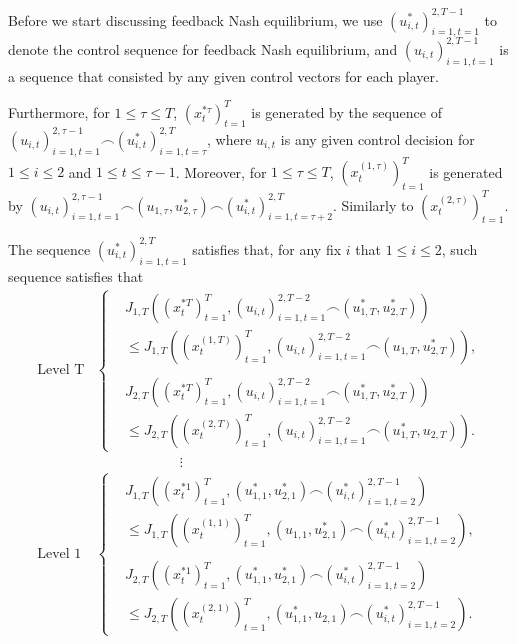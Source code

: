 \documentclass{article}
\begin{document}
Before we start discussing feedback Nash equilibrium, we use $(u_{i,t}^{*})_{i=1,t=1}^{2,T-1}$ to denote the control sequence for feedback Nash equilibrium, and $(u_{i,t})_{i=1,t=1}^{2,T-1}$ is a sequence that consisted by any given control vectors for each player. 

Furthermore, for $1 \leq \tau \leq T$, $(x_{t}^{*\tau})_{t=1}^{T}$ is generated by the sequence of $(u_{i,t})_{i=1,t=1}^{2,\tau-1} \frown (u_{i,t}^{*})_{i=1,t=\tau}^{2,T}$, where $u_{i,t}$ is any given control decision for $1 \leq i \leq 2$ and $1 \leq t \leq \tau-1$. Moreover, for $1 \leq \tau \leq T$, $(x_{t}^{(1,\tau)})_{t=1}^{T}$ is generated by $(u_{i,t})_{i=1,t=1}^{2,\tau-1} \frown (u_{1,\tau},u_{2,\tau}^{*}) \frown (u_{i,t}^{*})_{i=1,t=\tau+2}^{2,T}$. Similarly to $(x_{t}^{(2,\tau)})_{t=1}^{T}$.

The sequence $( u_{i,t}^{*})_{i=1,t=1}^{2,T}$ satisfies that, for any fix $i$ that $1 \leq i \leq 2$, such 
sequence satisfies that 
\begin{equation}\label{eq:nashIneq}
    \begin{split}
        \text{Level T}
        &\begin{cases}
            &J_{1,T}((x_{t}^{*T})_{t=1}^{T}, (u_{i,t})_{i=1,t=1}^{2,T-2} \frown (u_{1,T}^{*},u_{2,T}^{*})) \\ & \leq J_{1,T}((x_{t}^{(1,T)})_{t=1}^{T}, (u_{i,t})_{i=1,t=1}^{2,T-2} \frown (u_{1,T},u_{2,T}^{*})),\\ \\
            &J_{2,T}((x_{t}^{*T})_{t=1}^{T}, (u_{i,t})_{i=1,t=1}^{2,T-2} \frown (u_{1,T}^{*},u_{2,T}^{*})) \\ & \leq J_{2,T}((x_{t}^{(2,T)})_{t=1}^{T}, (u_{i,t})_{i=1,t=1}^{2,T-2} \frown (u_{1,T}^{*},u_{2,T})).
        \end{cases}
    \\ &\qquad \qquad \qquad \vdots \\
    \text{Level 1}
        &\begin{cases}
            &J_{1,T}((x_{t}^{*1})_{t=1}^{T}, (u_{1,1}^{*},u_{2,1}^{*}) \frown (u_{i,t}^{*})_{i=1,t=2}^{2,T-1}) \\ & \leq J_{1,T}((x_{t}^{(1,1)})_{t=1}^{T}, (u_{1,1},u_{2,1}^{*}) \frown (u_{i,t}^{*})_{i=1,t=2}^{2,T-1}),\\ \\
            &J_{2,T}((x_{t}^{*1})_{t=1}^{T}, (u_{1,1}^{*},u_{2,1}^{*}) \frown (u_{i,t}^{*})_{i=1,t=2}^{2,T-1}) \\ & \leq J_{2,T}((x_{t}^{(2,1)})_{t=1}^{T}, (u_{1,1}^{*},u_{2,1}) \frown (u_{i,t}^{*})_{i=1,t=2}^{2,T-1}).
        \end{cases}
    \end{split}
\end{equation}
\end{document}

